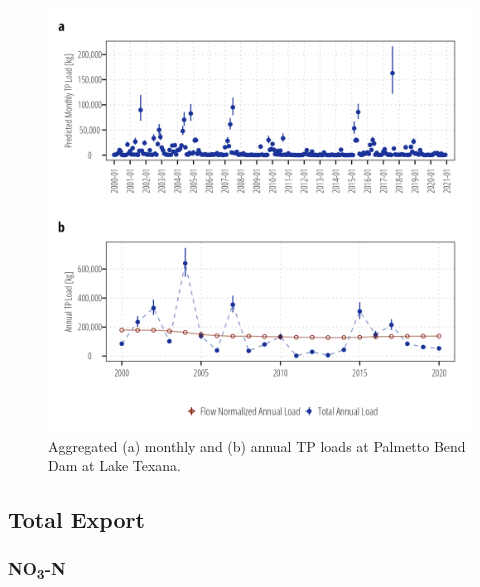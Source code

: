\documentclass[
]{article}
\begin{document}
\begin{figure}[h]

{\centering \includegraphics{load_estimates_files/figure-pdf/tp_aggregate-texana-1.png}

}

\caption{Aggregated (a) monthly and (b) annual TP loads at Palmetto Bend
Dam at Lake Texana.}

\end{figure}

\clearpage

\hypertarget{total-export}{%
\subsection{Total Export}\label{total-export}}

\hypertarget{no3-n}{%
\subsubsection{\texorpdfstring{NO\textsubscript{3}-N}{NO3-N}}\label{no3-n}}
\end{document}
